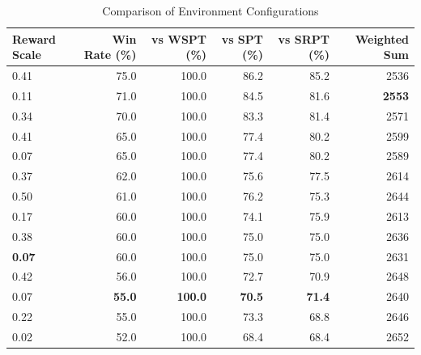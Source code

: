 \begin{table}[htbp]%
\centering%
\begin{tabular}{lrrrrr}%
\toprule%
\textbf{Reward Scale}&\textbf{Win Rate (\%)}&\textbf{vs WSPT (\%)}&\textbf{vs SPT (\%)}&\textbf{vs SRPT (\%)}&\textbf{Weighted Sum}\\%
\midrule%
0.41&75.0&100.0&86.2&85.2&2536\\%
0.11&71.0&100.0&84.5&81.6&\textbf{2553}\\%
0.34&70.0&100.0&83.3&81.4&2571\\%
0.41&65.0&100.0&77.4&80.2&2599\\%
0.07&65.0&100.0&77.4&80.2&2589\\%
0.37&62.0&100.0&75.6&77.5&2614\\%
0.50&61.0&100.0&76.2&75.3&2644\\%
0.17&60.0&100.0&74.1&75.9&2613\\%
0.38&60.0&100.0&75.0&75.0&2636\\%
\textbf{0.07}&60.0&100.0&75.0&75.0&2631\\%
0.42&56.0&100.0&72.7&70.9&2648\\%
0.07&\textbf{55.0}&\textbf{100.0}&\textbf{70.5}&\textbf{71.4}&2640\\%
0.22&55.0&100.0&73.3&68.8&2646\\%
0.02&52.0&100.0&68.4&68.4&2652\\%
\bottomrule%
\end{tabular}%
\caption{Comparison of Environment Configurations}%
\label{tab:environment}%
\end{table}